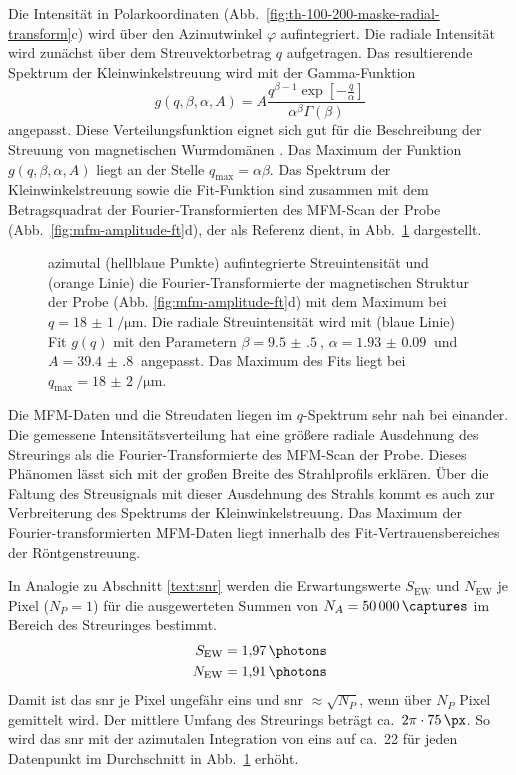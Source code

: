 \noindent
Die Intensität in Polarkoordinaten (Abb.~\ref{fig:th-100-200-maske-radial-transform}c) wird über den Azimutwinkel $\varphi$ aufintegriert. Die radiale Intensität wird zunächst über dem Streuvektorbetrag $q$ aufgetragen. Das resultierende Spektrum der Kleinwinkelstreuung wird mit der Gamma-Funktion
\begin{equation}
    g(q, \beta, \alpha, A) = A\frac{q^{\beta-1}\exp\left[-\frac{q}{\alpha}\right]}{\alpha^\beta\Gamma(\beta)}
\end{equation}
angepasst. Diese Verteilungsfunktion eignet sich gut für die Beschreibung der Streuung von magnetischen Wurmdomänen \cite{bagschik_employing_2016}. Das Maximum der Funktion $g(q, \beta, \alpha, A)$ liegt an der Stelle $q_\text{max} = \alpha\beta$. Das Spektrum der Kleinwinkelstreuung sowie die Fit-Funktion sind zusammen mit dem Betragsquadrat der Fourier-Transformierten des MFM-Scan der Probe (Abb.~\ref{fig:mfm-amplitude-ft}d), der als Referenz dient, in Abb.~\ref{fig:radius_fit} dargestellt.
\begin{figure}[H]
    \centering
    
    \caption{azimutal (hellblaue Punkte) aufintegrierte Streuintensität und (orange Linie) die Fourier-Transformierte der magnetischen Struktur der Probe (Abb. \ref{fig:mfm-amplitude-ft}d) mit dem Maximum bei $q =\SI{18(1)}{\per\micro\meter}$. Die radiale Streuintensität wird mit (blaue Linie) Fit $g(q)$ mit den Parametern $\beta = \SI{9.5(5)}{}$, $\alpha = \SI{1.93(9)}{}$ und $A = \SI{39.4(8)}{}$ angepasst. Das Maximum des Fits liegt bei $q_\text{max} = \SI{18(2)}{\per\micro\meter}$.}
    \label{fig:radius_fit}
\end{figure}
\noindent
Die MFM-Daten und die Streudaten liegen im $q$-Spektrum sehr nah bei einander. Die gemessene Intensitätsverteilung hat eine größere radiale Ausdehnung des Streurings als die Fourier-Transformierte des MFM-Scan der Probe. Dieses Phänomen lässt sich mit der großen Breite des Strahlprofils erklären. Über die Faltung des Streusignals mit dieser Ausdehnung des Strahls kommt es auch zur Verbreiterung des Spektrums der Kleinwinkelstreuung. Das Maximum der Fourier-transformierten MFM-Daten liegt innerhalb des Fit-Vertrauensbereiches der Röntgenstreuung.

\noindent
In Analogie zu Abschnitt \ref{text:snr} werden die Erwartungswerte $S_{\text{EW}}$ und $N_{\text{EW}}$ je Pixel ($N_P = 1$) für die ausgewerteten Summen von $N_A = \SI{50000}{\captures}$ im Bereich des Streuringes bestimmt.
\begin{equation}
    \begin{split}
        S_\text{EW} &= \SI{1.97}{\photons}\\
        N_\text{EW} &= \SI{1.91}{\photons}\\
    \end{split}
\end{equation}
Damit ist das \gls{snr} je Pixel ungefähr eins und \gls{snr} $\approx \sqrt{N_P}$, wenn über $N_P$ Pixel gemittelt wird. Der mittlere Umfang des Streurings beträgt ca.\ $2\pi\cdot\SI{75}{\px}$. So wird das \gls{snr} mit der azimutalen Integration von eins auf ca.\ 22 für jeden Datenpunkt im Durchschnitt in Abb.~\ref{fig:radius_fit} erhöht.

